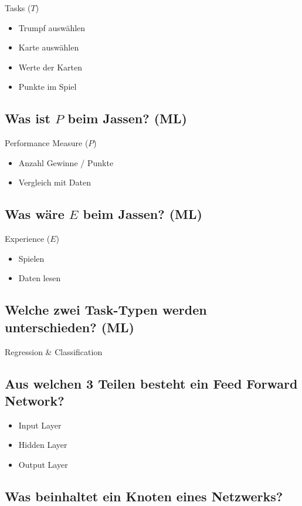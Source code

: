 \documentclass[a4paper]{article}
\begin{document}
		Tasks ($T$)
		\begin{itemize}
			\item Trumpf auswählen
			\item Karte auswählen
			\item Werte der Karten
			\item Punkte im Spiel
		\end{itemize}
	
		\subsection{Was ist $P$ beim Jassen? (ML)}
		
		Performance Measure ($P$)
		\begin{itemize}
			\item Anzahl Gewinne / Punkte
			\item Vergleich mit Daten
		\end{itemize}
		
		\subsection{Was wäre $E$ beim Jassen? (ML)}
		
		Experience ($E$)
		\begin{itemize}
			\item Spielen
			\item Daten lesen
		\end{itemize}
		
		\subsection{Welche zwei Task-Typen werden unterschieden? (ML)}
		
		Regression \& Classification
		
		\subsection{Aus welchen 3 Teilen besteht ein Feed Forward Network?}
		
		\begin{itemize}
			\item Input Layer
			\item Hidden Layer
			\item Output Layer
		\end{itemize}
	
		\subsection{Was beinhaltet ein Knoten eines Netzwerks?}
		
\end{document}
